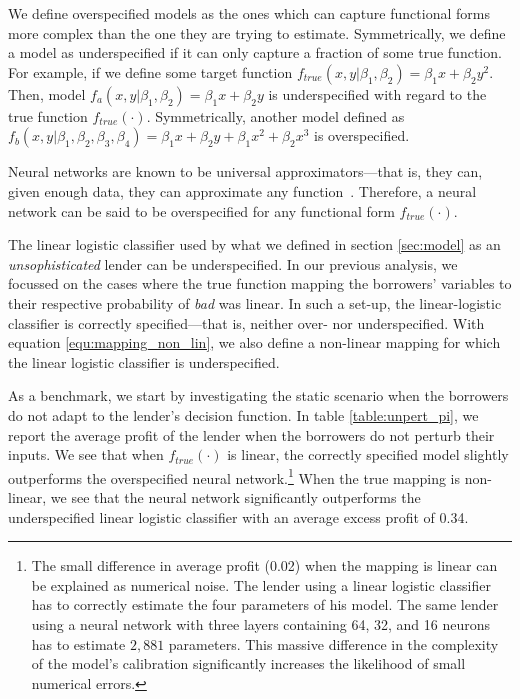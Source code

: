 \documentclass[12pt]{article} %
\begin{document}
We define overspecified models as the ones which can capture functional forms more complex than the one they are trying to estimate. Symmetrically, we define a model as underspecified if it can only capture a fraction of some true function. For example, if we define some target function $f_{true}(x,y|\beta_1,\beta_2)= \beta_1 x+\beta_2 y^2$. Then, model $f_a(x,y|\beta_1,\beta_2)= \beta_1 x+\beta_2 y$ is underspecified with regard to the true function $f_{true}(\cdot)$.  Symmetrically, another model defined as $f_b(x,y|\beta_1,\beta_2,\beta_3,\beta_4)= \beta_1 x+\beta_2 y +\beta_1 x^2 +\beta_2 x^3$ is overspecified.

Neural networks are known to be universal approximators---that is, they can, given enough data, they can approximate any 
function~\citep[see, e.g.,][]{hornik1989multilayer,hornik1991approximation}. Therefore, a neural network can be said to be overspecified for any functional form $f_{true}(\cdot)$. 

The linear logistic classifier used by what we defined in section \ref{sec:model} as an  \textit{unsophisticated} lender can be underspecified. In our previous analysis, we focussed on the cases where the true function mapping the borrowers' variables to their respective probability of \textit{bad} was linear. In such a set-up, the linear-logistic classifier is correctly specified---that is, neither over- nor underspecified. With equation \eqref{equ:mapping_non_lin}, we also define a non-linear mapping for which the linear logistic classifier is underspecified. 

As a benchmark, we start by investigating the static scenario when the borrowers do not adapt to the lender's decision function. In table \ref{table:unpert_pi}, we report the average profit of the lender when the borrowers do not perturb their inputs. We see that when $f_{true}(\cdot)$ is linear, the correctly specified model slightly outperforms the overspecified neural network.\footnote{The small difference in average profit (0.02) when the mapping is linear can be explained as numerical noise. The lender using a linear logistic classifier has to correctly estimate the four parameters of his model. The same lender using a neural network with three layers containing 64, 32, and 16 neurons has to estimate $2,881$ parameters. This massive difference in the complexity of the model's calibration significantly increases the likelihood of small numerical errors.}
When the true mapping is non-linear, we see that the neural network significantly outperforms the underspecified linear logistic classifier with an average excess profit of 0.34. 
\end{document}
